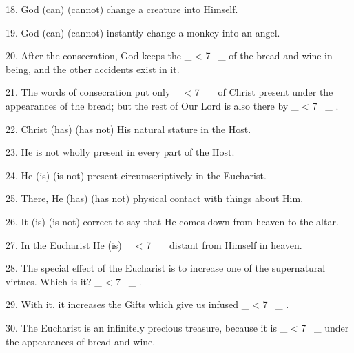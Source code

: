 \documentclass[a5paper]{article}
\newcommand\textjarman[1]{{\jarman #1}}
\newcounter{z}
\newcommand\spaces[1]{ \_\loop \ifnum\value{z} < #1
~\_%
\stepcounter{z}%
\repeat%
\setcounter{z}{0}}
\begin{document}
18.  God  (\textjarman{can}) (\textjarman{cannot}) 
change a creature into Himself. 

19. God (\textjarman{can})  (\textjarman{cannot}) instantly  change  a
monkey into an angel. 

20. After the consecration, God keeps the \spaces{7}  of
the bread and wine in being, and the other accidents exist in  it.  

21.  The
words of  consecration  put  only  \spaces{7}  of  Christ  present  under  the
appearances of the bread; but  the  rest  of  Our  Lord  is  also  there  by
\spaces{7}. 

22. Christ (\textjarman{has}) (\textjarman{has not}) His natural stature in  the  Host. 

23. 
He \textjarman{is not} wholly present in every part of the Host. 

24. He  (\textjarman{is})  (\textjarman{is
not}) present circumscriptively in the Eucharist. 

25. There,  He  (\textjarman{has})  (\textjarman{has
not}) physical contact with things about Him. 

26. It (\textjarman{is})  (\textjarman{is  not})  correct
to say that He comes down from heaven to the altar. 

27. In the Eucharist  He
(\textjarman{is}) \spaces{7} distant from Himself in heaven. 

28. The special effect of  the
Eucharist is to increase one of  the  supernatural  virtues.  Which  is  it?
\spaces{7}. 

29. With  it,  it  increases  the  Gifts  which  give  us  infused
\spaces{7}. 

30. The Eucharist is an infinitely precious treasure,  because  it
is \spaces{7} under the appearances of bread and wine.

\newpage
\end{document}
